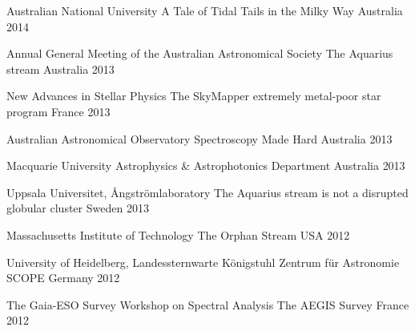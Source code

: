 \begin{cvhonors}
	\cvhonor
	{Australian National University}
	{A Tale of Tidal Tails in the Milky Way}
	{Australia}
	{2014}

	\cvhonor
	{Annual General Meeting of the Australian Astronomical Society}
	{The Aquarius stream}
	{Australia}
	{2013}
	
	\cvhonor
	{New Advances in Stellar Physics}
	{The SkyMapper extremely metal-poor star program}
	{France}
	{2013}
	
	\cvhonor
	{Australian Astronomical Observatory}
	{Spectroscopy Made Hard}
	{Australia}
	{2013}

	\cvhonor
	{Macquarie University Astrophysics \& Astrophotonics Department}
	{}
	{Australia}
	{2013}

	\cvhonor
	{Uppsala Universitet, \AA{}ngstr\"{o}mlaboratory}
	{The Aquarius stream is not a disrupted globular cluster}
	{Sweden}
	{2013}

	\cvhonor
	{Massachusetts Institute of Technology}
	{The Orphan Stream}
	{USA}
	{2012}

	\cvhonor
	{University of Heidelberg, Landessternwarte K\"onigstuhl Zentrum f\"ur Astronomie}
	{SCOPE}
	{Germany}
	{2012}
	
	\cvhonor
	{The Gaia-ESO Survey Workshop on Spectral Analysis}
	{The AEGIS Survey}
	{France}
	{2012}
	
\end{cvhonors}
